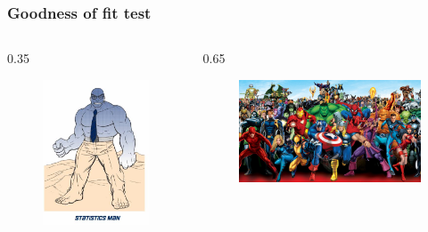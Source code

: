 \documentclass[aspectratio=169]{beamer}
\begin{document}
\begin{frame}
  \frametitle{Goodness of fit test}

  \begin{columns}
    \begin{column} {0.35\textwidth}

    \begin{figure}
      \centering
        \includegraphics[height=.6\textheight]{img/les6-man.jpg}
    \end{figure}

    \end{column}
    \begin{column} {0.65\textwidth}

    \begin{figure}
      \centering
        \includegraphics[width=.8\textwidth]{img/les5-heroes.jpg}
    \end{figure}

    \end{column}
  \end{columns}
\end{frame}
\end{document}
